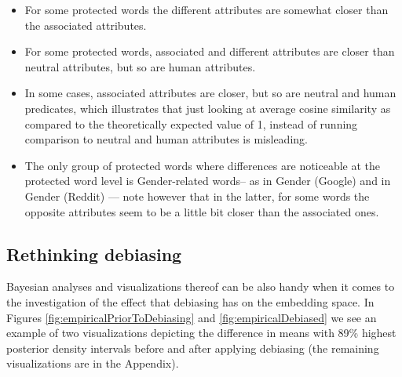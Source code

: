 \documentclass[
  12pt,
  dvipsnames,enabledeprecatedfontcommands]{scrartcl}
\begin{document}
\begin{itemize}
\item
  For some protected words the different attributes are somewhat closer
  than the associated attributes.
\item
  For some protected words, associated and different attributes are
  closer than neutral attributes, but so are human attributes.
\item
  In some cases, associated attributes are closer, but so are neutral
  and human predicates, which illustrates that just looking at average
  cosine similarity as compared to the theoretically expected value of
  1, instead of running comparison to neutral and human attributes is
  misleading.
\item
  The only group of protected words where differences are noticeable at
  the protected word level is Gender-related words-- as in Gender
  (Google) and in Gender (Reddit) --- note however that in the latter,
  for some words the opposite attributes seem to be a little bit closer
  than the associated ones.
\end{itemize}

\hypertarget{rethinking-debiasing}{%
\subsection{Rethinking debiasing}\label{rethinking-debiasing}}

\label{subsec:rethinking}

Bayesian analyses and visualizations thereof can be also handy when it
comes to the investigation of the effect that debiasing has on the
embedding space. In Figures \ref{fig:empiricalPriorToDebiasing} and
\ref{fig:empiricalDebiased} we see an example of two visualizations
depicting the difference in means with 89\% highest posterior density
intervals before and after applying debiasing (the remaining
visualizations are in the Appendix).
\end{document}
